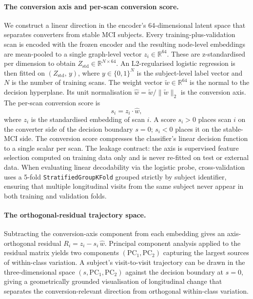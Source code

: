 \paragraph{The conversion axis and per-scan conversion score.}
We construct a linear direction in the encoder's 64-dimensional latent space that separates
converters from stable \ac{MCI} subjects. Every training-plus-validation scan is encoded
with the frozen encoder and the resulting node-level embeddings are mean-pooled to a
single graph-level vector $z_i \in \mathbb{R}^{64}$. These are z-standardised per
dimension to obtain $Z_{\text{std}} \in \mathbb{R}^{N \times 64}$. An L2-regularised
logistic regression is then fitted on $(Z_{\text{std}},\, y)$, where $y \in \{0,1\}^N$ is
the subject-level label vector and $N$ is the number of training scans. The weight vector
$\tilde{w} \in \mathbb{R}^{64}$ is the normal to the decision hyperplane. Its unit
normalisation $\hat{w} = \tilde{w}/\|\tilde{w}\|_2$ is the conversion axis. The per-scan
conversion score is
\begin{equation}
  s_i = z_i \cdot \hat{w},
  \label{eq:conversion-score}
\end{equation}
where $z_i$ is the standardised embedding of scan $i$. A score $s_i > 0$ places scan $i$
on the converter side of the decision boundary $s = 0$; $s_i < 0$ places it on the
stable-\ac{MCI} side. The conversion score compresses the classifier's linear decision function to a
single scalar per scan. The leakage contract:
the axis is supervised feature selection computed on training data only and is never
re-fitted on test or external data. When evaluating linear decodability via the logistic probe,
cross-validation uses a 5-fold \texttt{StratifiedGroupKFold} grouped strictly by subject identifier,
ensuring that multiple longitudinal visits from the same subject never appear in both training
and validation folds.

\paragraph{The orthogonal-residual trajectory space.}
Subtracting the conversion-axis component from each embedding gives an axis-orthogonal
residual $R_i = z_i - s_i\,\hat{w}$. Principal component analysis applied to the residual
matrix yields two components $(\mathrm{PC}_1, \mathrm{PC}_2)$ capturing the largest
sources of within-class variation. A subject's visit-to-visit trajectory can be drawn in
the three-dimensional space $(s, \mathrm{PC}_1, \mathrm{PC}_2)$ against the decision
boundary at $s = 0$, giving a geometrically grounded visualisation of longitudinal change
that separates the conversion-relevant direction from orthogonal within-class variation.

